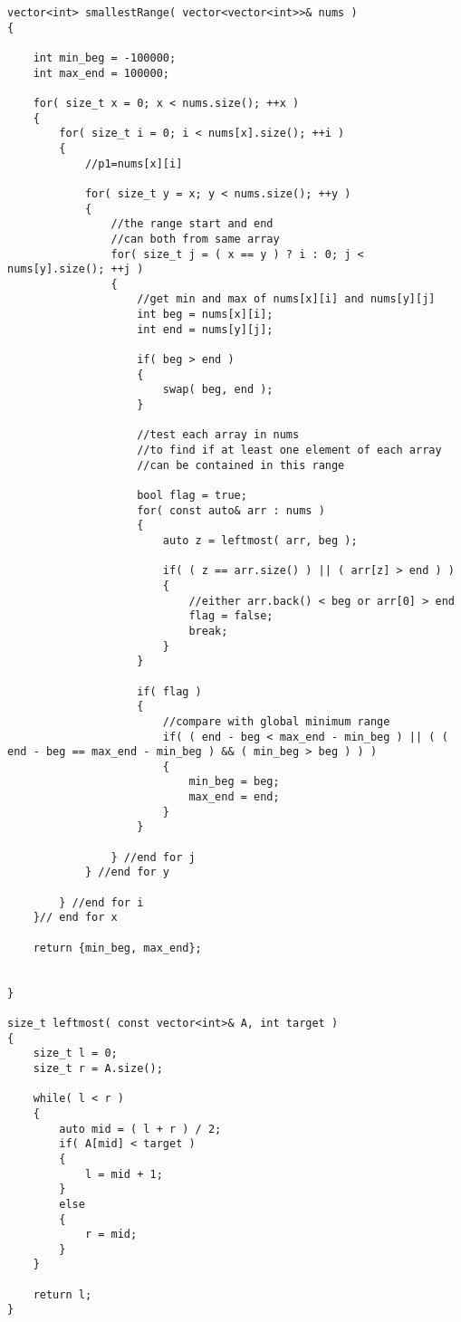 \setcounter{lstlisting}{0}
\begin{lstlisting}[style=customc, caption={Brute Force With Binary Search}]
vector<int> smallestRange( vector<vector<int>>& nums )
{

    int min_beg = -100000;
    int max_end = 100000;

    for( size_t x = 0; x < nums.size(); ++x )
    {
        for( size_t i = 0; i < nums[x].size(); ++i )
        {
            //p1=nums[x][i]

            for( size_t y = x; y < nums.size(); ++y )
            {
                //the range start and end
                //can both from same array
                for( size_t j = ( x == y ) ? i : 0; j < nums[y].size(); ++j )
                {
                    //get min and max of nums[x][i] and nums[y][j]
                    int beg = nums[x][i];
                    int end = nums[y][j];

                    if( beg > end )
                    {
                        swap( beg, end );
                    }

                    //test each array in nums
                    //to find if at least one element of each array
                    //can be contained in this range

                    bool flag = true;
                    for( const auto& arr : nums )
                    {
                        auto z = leftmost( arr, beg );

                        if( ( z == arr.size() ) || ( arr[z] > end ) )
                        {
                            //either arr.back() < beg or arr[0] > end
                            flag = false;
                            break;
                        }
                    }

                    if( flag )
                    {
                        //compare with global minimum range
                        if( ( end - beg < max_end - min_beg ) || ( ( end - beg == max_end - min_beg ) && ( min_beg > beg ) ) )
                        {
                            min_beg = beg;
                            max_end = end;
                        }
                    }

                } //end for j
            } //end for y

        } //end for i
    }// end for x

    return {min_beg, max_end};


}

size_t leftmost( const vector<int>& A, int target )
{
    size_t l = 0;
    size_t r = A.size();

    while( l < r )
    {
        auto mid = ( l + r ) / 2;
        if( A[mid] < target )
        {
            l = mid + 1;
        }
        else
        {
            r = mid;
        }
    }

    return l;
}
\end{lstlisting}

